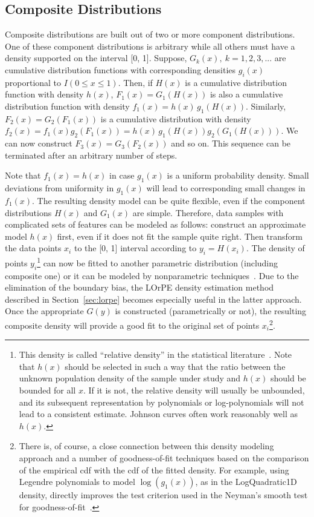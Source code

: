 \documentclass[12pt,titlepage]{article}
\newcommand{\cname}[1]{\index{#1}\textsf{#1}}
\begin{document}
\subsection{Composite Distributions}

Composite distributions are built out of two or more
component distributions. One of these component distributions is
arbitrary while
all others must have a density supported on the interval
[0, 1]. Suppose, $G_k(x), \ k = 1, 2, 3, ...$ are cumulative
distribution functions with corresponding densities $g_i(x)$
proportional to $I(0 \le x \le 1)$.
Then, if $H(x)$ is a cumulative distribution function
with density $h(x)$, $F_1(x) = G_1(H(x))$ is also a cumulative
distribution function with density $f_1(x) = h(x) \, g_1(H(x))$.
Similarly, $F_2(x) = G_2(F_1(x))$ is a cumulative distribution with density
$f_2(x) = f_1(x) g_2(F_1(x)) = h(x) \, g_1(H(x)) g_2(G_1(H(x)))$.
We can now construct $F_3(x) = G_3(F_2(x))$ and so on. This sequence can
be terminated after an arbitrary number of steps.

Note that $f_1(x) = h(x)$ in case $g_1(x)$ is a uniform
probability density. Small deviations from uniformity in $g_1(x)$
will lead to corresponding small changes in $f_1(x)$.
The resulting density model can be quite flexible, even if
the component distributions $H(x)$ and $G_1(x)$ are
simple. Therefore, data samples with complicated sets
of features can be modeled as follows: construct
an approximate model $h(x)$ first, even if it does not fit
the sample quite right.
Then transform the data points $x_i$ to the [0, 1] interval
according to $y_i = H(x_i)$. The density of 
points $y_i$\footnote{This density is called ``relative density'' 
in the statistical literature~\cite{ref:handcock}. Note
that $h(x)$ should be selected in such a way that the ratio between
the unknown population density of the sample under study and $h(x)$ should
be bounded for all $x$. If it is not, the relative density
will usually be unbounded, and its subsequent representation
by polynomials or log-polynomials will not lead to a consistent
estimate. Johnson curves often work reasonably well as $h(x)$.}
can now be
fitted to another parametric distribution (including composite one)
or it can be modeled by nonparametric techniques~\cite{ref:kdetransform}.
Due to the elimination of the boundary bias, the LOrPE density
estimation method described in Section~\ref{sec:lorpe}
becomes especially useful in the latter approach.
Once the appropriate $G(y)$ is constructed (parametrically
or not), the resulting composite density will provide
a good fit to the original set of points $x_i$\footnote{There is,
of course, a close connection between this density modeling
approach and a number of goodness-of-fit techniques based on
the comparison of the empirical cdf
with the cdf of the fitted density. For example, using
Legendre polynomials to model $\log (g_1(x))$, as in the
\cname{LogQuadratic1D} density, directly
improves the test criterion used in the Neyman's
smooth test for goodness-of-fit~\cite{ref:thas, ref:smoothtest}.}.
\end{document}
